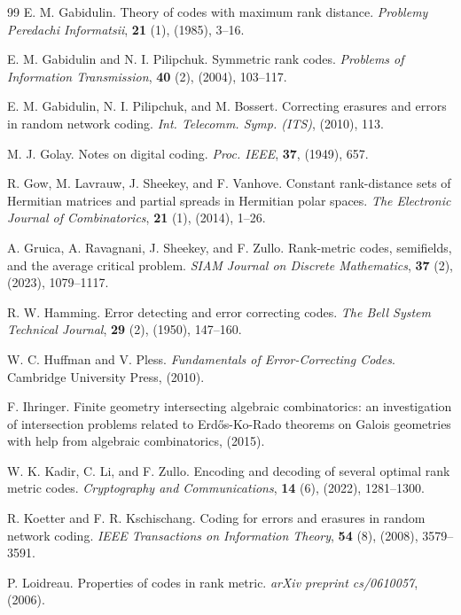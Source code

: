 \documentclass[12pt,a4paper]{article}
\begin{document}
\begin{thebibliography}{99}
 E. M. Gabidulin. Theory of codes with maximum rank distance. {\it Problemy Peredachi Informatsii}, \textbf{21} (1), (1985), 3–16.

 E. M. Gabidulin and N. I. Pilipchuk. Symmetric rank codes. {\it Problems of Information Transmission}, \textbf{40} (2), (2004), 103–117.

 E. M. Gabidulin, N. I. Pilipchuk, and M. Bossert. Correcting erasures and errors in random network coding. {\it Int. Telecomm. Symp. (ITS)}, (2010), 113.

 M. J. Golay. Notes on digital coding. {\it Proc. IEEE}, \textbf{37}, (1949), 657.

 R. Gow, M. Lavrauw, J. Sheekey, and F. Vanhove. Constant rank-distance sets of Hermitian matrices and partial spreads in Hermitian polar spaces. {\it The Electronic Journal of Combinatorics}, \textbf{21} (1), (2014), 1–26.

 A. Gruica, A. Ravagnani, J. Sheekey, and F. Zullo. Rank-metric codes, semifields, and the average critical problem. {\it SIAM Journal on Discrete Mathematics}, \textbf{37} (2), (2023), 1079–1117.

 R. W. Hamming. Error detecting and error correcting codes. {\it The Bell System Technical Journal}, \textbf{29} (2), (1950), 147–160.

 W. C. Huffman and V. Pless. {\it Fundamentals of Error-Correcting Codes}. Cambridge University Press, (2010).

 F. Ihringer. Finite geometry intersecting algebraic combinatorics: an investigation of intersection problems related to Erdős-Ko-Rado theorems on Galois geometries with help from algebraic combinatorics, (2015).

 W. K. Kadir, C. Li, and F. Zullo. Encoding and decoding of several optimal rank metric codes. {\it Cryptography and Communications}, \textbf{14} (6), (2022), 1281–1300.

 R. Koetter and F. R. Kschischang. Coding for errors and erasures in random network coding. {\it IEEE Transactions on Information Theory}, \textbf{54} (8), (2008), 3579–3591.

 P. Loidreau. Properties of codes in rank metric. {\it arXiv preprint cs/0610057}, (2006).


\end{thebibliography}
\end{document}
